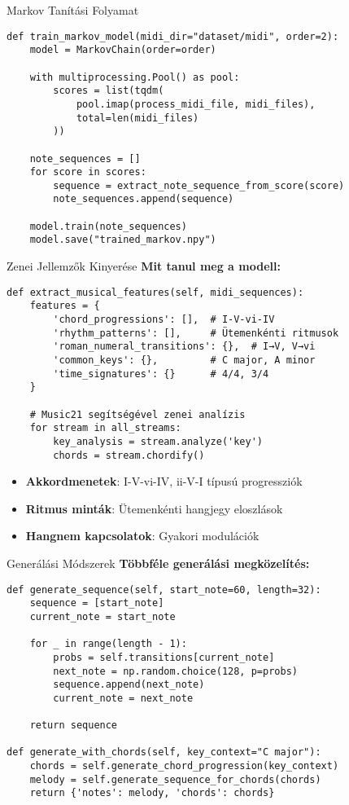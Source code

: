 \documentclass[aspectratio=169]{beamer}
\begin{document}
\begin{frame}[fragile]{Markov Tanítási Folyamat}

\begin{lstlisting}
def train_markov_model(midi_dir="dataset/midi", order=2):
    model = MarkovChain(order=order)
    
    with multiprocessing.Pool() as pool:
        scores = list(tqdm(
            pool.imap(process_midi_file, midi_files),
            total=len(midi_files)
        ))
    
    note_sequences = []
    for score in scores:
        sequence = extract_note_sequence_from_score(score)
        note_sequences.append(sequence)
    
    model.train(note_sequences)
    model.save("trained_markov.npy")
\end{lstlisting}
\end{frame}

\begin{frame}[fragile]{Zenei Jellemzők Kinyerése}
\textbf{Mit tanul meg a modell:}

\begin{lstlisting}
def extract_musical_features(self, midi_sequences):
    features = {
        'chord_progressions': [],  # I-V-vi-IV
        'rhythm_patterns': [],     # Ütemenkénti ritmusok
        'roman_numeral_transitions': {},  # I→V, V→vi
        'common_keys': {},         # C major, A minor
        'time_signatures': {}      # 4/4, 3/4
    }
    
    # Music21 segítségével zenei analízis
    for stream in all_streams:
        key_analysis = stream.analyze('key')
        chords = stream.chordify()
\end{lstlisting}

\begin{itemize}
    \item \textbf{Akkordmenetek}: I-V-vi-IV, ii-V-I típusú progressziók
    \item \textbf{Ritmus minták}: Ütemenkénti hangjegy eloszlások
    \item \textbf{Hangnem kapcsolatok}: Gyakori modulációk
\end{itemize}
\end{frame}

\begin{frame}[fragile]{Generálási Módszerek}
\textbf{Többféle generálási megközelítés:}

\begin{lstlisting}
def generate_sequence(self, start_note=60, length=32):
    sequence = [start_note]
    current_note = start_note
    
    for _ in range(length - 1):
        probs = self.transitions[current_note]
        next_note = np.random.choice(128, p=probs)
        sequence.append(next_note)
        current_note = next_note
    
    return sequence

def generate_with_chords(self, key_context="C major"):
    chords = self.generate_chord_progression(key_context)
    melody = self.generate_sequence_for_chords(chords)
    return {'notes': melody, 'chords': chords}
\end{lstlisting}
\end{frame}
\end{document}
